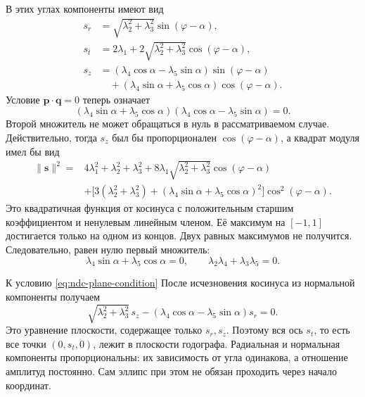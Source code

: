В этих углах компоненты имеют вид
\begin{equation}
\begin{aligned}
 s_r&=\sqrt{\lambda_2^2+\lambda_3^2}\sin(\varphi-\alpha),\\
 s_t&=2\lambda_1+2\sqrt{\lambda_2^2+\lambda_3^2}
                       \cos(\varphi-\alpha),\\
 s_z&=(\lambda_4\cos\alpha-\lambda_5\sin\alpha)
                       \sin(\varphi-\alpha)\\
    &\quad+(\lambda_4\sin\alpha+\lambda_5\cos\alpha)
                       \cos(\varphi-\alpha).
\end{aligned}
\label{eq:ndc-shifted-components}
\end{equation}
Условие $\boldsymbol p\cdot\boldsymbol q=0$ теперь означает
\[
 (\lambda_4\sin\alpha+\lambda_5\cos\alpha)
 (\lambda_4\cos\alpha-\lambda_5\sin\alpha)=0.
\]
Второй множитель не может обращаться в нуль в рассматриваемом
случае. Действительно, тогда $s_z$ был бы пропорционален
$\cos(\varphi-\alpha)$, а квадрат модуля имел бы вид
\[
\begin{aligned}
 \|\boldsymbol s\|^2={}&4\lambda_1^2+\lambda_2^2+\lambda_3^2
 +8\lambda_1\sqrt{\lambda_2^2+\lambda_3^2}\cos(\varphi-\alpha)\\
 &+\bigl[3(\lambda_2^2+\lambda_3^2)
       +(\lambda_4\sin\alpha+\lambda_5\cos\alpha)^2\bigr]
             \cos^2(\varphi-\alpha).
\end{aligned}
\]
Это квадратичная функция от косинуса с положительным старшим
коэффициентом и ненулевым линейным членом. Её максимум на
$[-1,1]$ достигается только на одном из концов. Двух равных
максимумов не получится. Следовательно, равен нулю первый множитель:
\begin{equation}
 \lambda_4\sin\alpha+\lambda_5\cos\alpha=0,
 \qquad \boxed{\lambda_2\lambda_4+\lambda_3\lambda_5=0.}
 \label{eq:ndc-plane-condition}
\end{equation}

\begin{explanation}{К условию \eqref{eq:ndc-plane-condition}}
После исчезновения косинуса из нормальной компоненты получаем
\[
 \sqrt{\lambda_2^2+\lambda_3^2}\,s_z
 -(\lambda_4\cos\alpha-\lambda_5\sin\alpha)s_r=0.
\]
Это уравнение плоскости, содержащее только $s_r,s_z$.
Поэтому вся ось $s_t$, то есть все точки $(0,s_t,0)$, лежит
в плоскости годографа. Радиальная и нормальная компоненты
пропорциональны: их зависимость от угла одинакова, а отношение
амплитуд постоянно.
Сам эллипс при этом не обязан проходить через начало координат.
\end{explanation}

